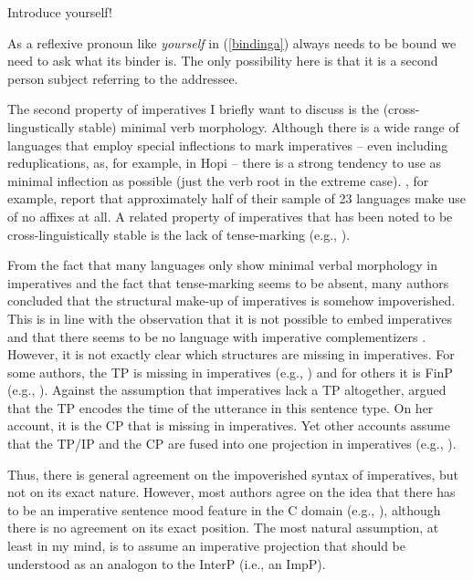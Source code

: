 \begin{exe}
\ex Introduce yourself! \label{bindinga}
\end{exe} 


\newpage 
\noindent As a reflexive pronoun like \textit{yourself} in (\ref{bindinga}) always needs to be bound we need to ask what its binder is. The only possibility here is that it is a second person subject referring to the addressee.

The second property of imperatives I briefly want to discuss is the (cross-lingustically stable) minimal verb morphology. Although there is a wide range of languages that employ special inflections to mark imperatives -- even including reduplications, as, for example, in Hopi \citep{benett1981} -- there is a strong tendency to use as minimal inflection as possible (just the verb root in the extreme case). \citet[172--173]{sadock1985speech}, for example, report that approximately half of their sample of 23 languages make use of no affixes at all. A related property of imperatives that has been noted to be cross-linguistically stable is the lack of tense-marking (e.g., \citealt{sadock1985speech}).

From the fact that many languages only show minimal verbal morphology in imperatives and the fact that tense-marking seems to be absent, many authors concluded that the structural make-up of imperatives is somehow impoverished. This is in line with the observation that it is not possible to embed imperatives \citep[78]{katz1964theory} and that there seems to be no language with imperative complementizers \citep[281]{konig2007speech}. However, it is not exactly clear which structures are missing in imperatives. For some authors, the TP is missing in imperatives (e.g., \citealt{zanuttini1991syntactic}) and for others it is FinP (e.g., \citealt{platzack1998subject}). Against the assumption that imperatives lack a TP altogether, \citet{jensen2007favour} argued that the TP encodes the time of the utterance in this sentence type. On her account, it is the CP that is missing in imperatives. Yet other accounts assume that the TP/IP and the CP are fused into one projection in imperatives (e.g., \citealt{wratil2005syntax}).

Thus, there is general agreement on the impoverished syntax of imperatives, but not on its exact nature. However, most authors agree on the idea that there has to be an imperative sentence mood feature in the C domain (e.g., \citealt{rivero1995imperatives, zanuttini1997negation, platzack1998subject, potsdam2007analysing}), although there is no agreement on its exact position. The most natural assumption, at least in my mind, is to assume an imperative projection that should be understood as an analogon to the InterP (i.e., an ImpP). 

